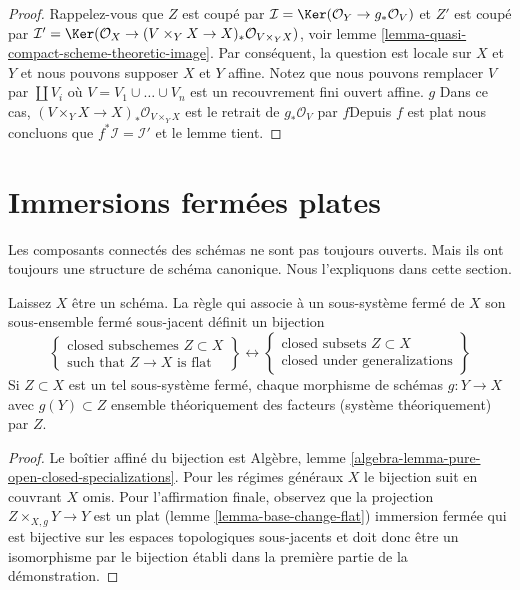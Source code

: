 \begin{proof}

Rappelez-vous que $Z$ est coupé par
$\mathcal{I} = \Ker(\mathcal{O}_Y \to g_*\mathcal{O}_V)$
et $Z'$ est coupé par
$\mathcal{I}' = \Ker(\mathcal{O}_X \to
(V \times_Y X \to X)_*\mathcal{O}_{V \times_Y X})$, voir lemme \ref{lemma-quasi-compact-scheme-theoretic-image}. Par conséquent, la question est locale sur $X$ et $Y$ et nous pouvons supposer $X$ et $Y$
affine. Notez que nous pouvons remplacer $V$ par $\coprod V_i$ où
$V = V_1 \cup \ldots \cup V_n$ est un recouvrement fini ouvert affine. $g$ Dans ce cas,
$(V \times_Y X \to X)_*\mathcal{O}_{V \times_Y X}$ est le retrait de $g_*\mathcal{O}_V$ par $f$Depuis $f$ est plat nous concluons que
$f^*\mathcal{I} = \mathcal{I}'$ et le lemme tient.

\end{proof}




\section{Immersions fermées plates}
\label{section-flat-closed-immersions}

\noindent
Les composants connectés des schémas ne sont pas toujours ouverts. Mais ils ont toujours une structure de schéma canonique. Nous l'expliquons dans cette section.

\begin{lemma}

\label{lemma-characterize-flat-closed-immersions}
Laissez $X$ être un schéma. La règle qui associe à un sous-système fermé de $X$ son sous-ensemble fermé sous-jacent définit un bijection $$
\left\{
\begin{matrix}
\text{closed subschemes }Z \subset X \\
\text{such that }Z \to X\text{ is flat}
\end{matrix}
\right\}
\leftrightarrow
\left\{
\begin{matrix}
\text{closed subsets }Z \subset X \\
\text{closed under generalizations}
\end{matrix}
\right\}
$$ Si $Z \subset X$ est un tel sous-système fermé, chaque morphisme de schémas $g : Y \to X$ avec $g(Y) \subset Z$ ensemble théoriquement des facteurs (système théoriquement) par $Z$.
\end{lemma}

\begin{proof}

Le boîtier affiné du bijection est Algèbre, lemme \ref{algebra-lemma-pure-open-closed-specializations}. Pour les régimes généraux $X$ le bijection suit en couvrant $X$ omis. Pour l'affirmation finale, observez que la projection $Z \times_{X, g} Y \to Y$ est un plat (lemme \ref{lemma-base-change-flat}) immersion fermée qui est bijective sur les espaces topologiques sous-jacents et doit donc être un isomorphisme par le bijection établi dans la première partie de la démonstration.

\end{proof}

